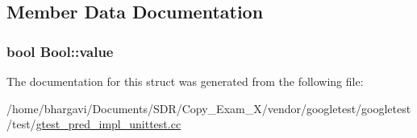 \subsection{Member Data Documentation}
\subsubsection[{\texorpdfstring{value}{value}}]{\setlength{\rightskip}{0pt plus 5cm}bool Bool\+::value}\hypertarget{struct_bool_a16be863c269f988cdcbe59f9d846a141}{}\label{struct_bool_a16be863c269f988cdcbe59f9d846a141}


The documentation for this struct was generated from the following file\+:\begin{DoxyCompactItemize}
\item 
/home/bhargavi/\+Documents/\+S\+D\+R/\+Copy\+\_\+\+Exam\+\_\+X/vendor/googletest/googletest/test/\hyperlink{gtest__pred__impl__unittest_8cc}{gtest\+\_\+pred\+\_\+impl\+\_\+unittest.\+cc}\end{DoxyCompactItemize}
